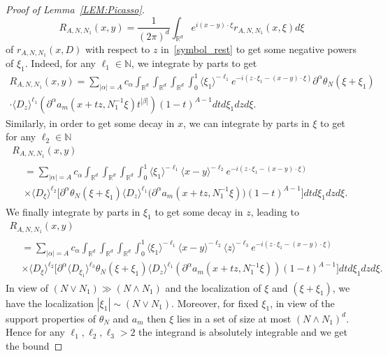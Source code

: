\documentclass[10pt]{amsart}
\theoremstyle{definition}\newtheorem{defi}[theo]{Definition}\newtheorem{rema}[theo]{Remark}\newtheorem{exam}[theo]{Example}\newtheorem{exem}[theo]{Example}\newtheorem{nota}[theo]{Notation}
\newcommand{\R}{\mathbb{R}}
\newcommand{\N}{\mathbb{N}}
\newcommand{\jb}[1] {\langle #1 \rangle}
\begin{document}
\begin{proof}[Proof of Lemma~\ref{LEM:Picasso}]
\begin{equation*}
R_{A,N,N_1}(x,y)=\frac{1}{(2\pi)^d}\int_{\R^d}e^{i(x-y)\cdot\xi}r_{A,N,N_1}(x,\xi)d\xi
\end{equation*}
of $r_{A,N,N_1}(x,D)$ with respect to $z$ in~\eqref{symbol_rest} to get some negative powers of $\xi_1$. Indeed, for any $\ell_1\in\N$, we integrate by parts to get
\begin{multline*}
R_{A,N,N_1}(x,y)=\sum_{|\alpha|=A}c_{\alpha}\int_{\R^d}\int_{\R^d}\int_{\R^d}\int_0^1\jb{\xi_1}^{-\ell_1}e^{-i(z\cdot\xi_1-(x-y)\cdot\xi)}\partial^{\alpha}\theta_N(\xi+\xi_1)\\
\cdot\jb{D_z}^{\ell_1}\left(\partial^{\alpha}a_{m}\left(x+tz,N_1^{-1}\xi\right)t^{|\beta|}\right)(1-t)^{A-1}dtd\xi_1 dzd\xi.
\end{multline*}
Similarly, in order to get some decay in $x$, we can integrate by parts in $\xi$ to get for any $\ell_2\in\N$
\begin{multline*}
R_{A,N,N_1}(x,y)\\
\begin{aligned}
&=\sum_{|\alpha|=A}c_{\alpha}\int_{\R^d}\int_{\R^d}\int_{\R^d}\int_0^1\jb{\xi_1}^{-\ell_1}\jb{x-y}^{-\ell_2}e^{-i(z\cdot\xi_1-(x-y)\cdot\xi)}\\
&\times\jb{D_{\xi}}^{\ell_2}\Big[\partial^{\alpha}\theta_N(\xi+\xi_1)\jb{D_z}^{\ell_1}\big(\partial^{\alpha}a_{m}\left(x+tz,N_1^{-1}\xi\right)\big)(1-t)^{A-1}\Big]dtd\xi_1 dzd\xi.
\end{aligned}
\end{multline*}
We finally integrate by parts in $\xi_1$ to get some decay in $z$, leading to
\begin{multline*}
R_{A,N,N_1}(x,y)\\
\begin{aligned}
&=\sum_{|\alpha|=A}c_{\alpha}\int_{\R^d}\int_{\R^d}\int_{\R^d}\int_0^1\jb{\xi_1}^{-\ell_1}\jb{x-y}^{-\ell_2}\jb{z}^{-\ell_3}e^{-i(z\cdot\xi_1-(x-y)\cdot\xi)}\\
&\times\jb{D_{\xi}}^{\ell_2}\Big[\partial^{\alpha}\jb{D_{\xi_1}}^{\ell_3}\theta_N(\xi+\xi_1)\jb{D_z}^{\ell_1}\left(\partial^{\alpha}a_{m}\left(x+tz,N_1^{-1}\xi\right)\right)(1-t)^{A-1}\Big]dtd\xi_1 dzd\xi.
\end{aligned}
\end{multline*}
In view of $(N\vee N_1)\gg (N\wedge N_1)$ and the localization of $\xi$ and $(\xi+\xi_1)$, we have the localization $|\xi_1|\sim (N\vee N_1)$. Moreover, for fixed $\xi_1$, in view of the support properties of $\theta_N$ and $a_m$ then $\xi$ lies in a set of size at most $(N\wedge N_1)^d$. Hence for any $\ell_1,\ell_2,\ell_3>2$ the integrand is absolutely integrable and we get the bound

\end{proof}
\end{document}
